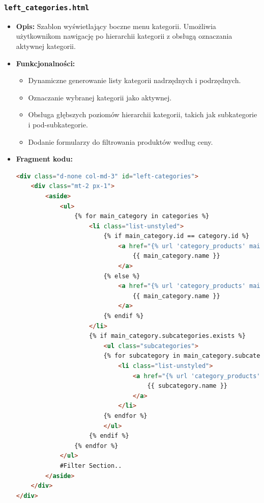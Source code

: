 \documentclass[12pt,a4paper,oneside]{article}
\theoremstyle{definition}
\numberwithin{equation}{section}
\begin{document}
\subsubsection*{\texttt{left\_categories.html}}
\begin{itemize}
    \item \textbf{Opis:}
    Szablon wyświetlający boczne menu kategorii. Umożliwia użytkownikom nawigację po hierarchii kategorii z obsługą oznaczania aktywnej kategorii.
    \item \textbf{Funkcjonalności:}
    \begin{itemize}
        \item Dynamiczne generowanie listy kategorii nadrzędnych i podrzędnych.
        \item Oznaczanie wybranej kategorii jako aktywnej.
        \item Obsługa głębszych poziomów hierarchii kategorii, takich jak 
            \subsubitem subkategorie i pod-subkategorie.
        \item Dodanie formularzy do filtrowania produktów według ceny.
    \end{itemize}
    \item \textbf{Fragment kodu:}
    \begin{lstlisting}[language=HTML, caption=Fragment szablonu \texttt{left\_categories.html}]
<div class="d-none col-md-3" id="left-categories">
    <div class="mt-2 px-1">
        <aside>
            <ul>
                {% for main_category in categories %}
                    <li class="list-unstyled">
                        {% if main_category.id == category.id %}
                            <a href="{% url 'category_products' main_category.id %}" class="active">
                                {{ main_category.name }}
                            </a>
                        {% else %}
                            <a href="{% url 'category_products' main_category.id %}">
                                {{ main_category.name }}
                            </a>
                        {% endif %}
                    </li>
                    {% if main_category.subcategories.exists %}
                        <ul class="subcategories">
                        {% for subcategory in main_category.subcategories.all %}
                            <li class="list-unstyled">
                                <a href="{% url 'category_products' subcategory.id %}" class="fw-bold">
                                    {{ subcategory.name }}
                                </a>
                            </li>
                        {% endfor %}
                        </ul>
                    {% endif %}
                {% endfor %}
            </ul>
            #Filter Section..
        </aside>
    </div>
</div>
    \end{lstlisting}
\end{itemize}
\end{document}
